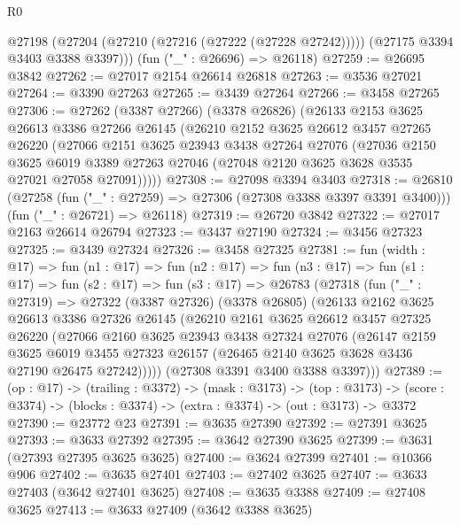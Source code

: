 \begin{lexlean}{R0}
\begin{coremodule}
      @27198 (@27204 (@27210 (@27216 (@27222 (@27228 @27242))))) (@27175 @3394 @3403 @3388 @3397)))
    (fun ("_" : @26696) => @26118)
@27259 := @26695 @3842
@27262 := @27017 @2154 @26614 @26818
@27263 := @3536 @27021
@27264 := @3390 @27263
@27265 := @3439 @27264
@27266 := @3458 @27265
@27306 := @27262
    (@3387 @27266)
    (@3378 @26826)
    (@26133
      @2153
      @3625
      @26613
      @3386
      @27266
      @26145
      (@26210
        @2152
        @3625
        @26612
        @3457
        @27265
        @26220
        (@27066
          @2151
          @3625
          @23943
          @3438
          @27264
          @27076
          (@27036
            @2150
            @3625
            @6019
            @3389
            @27263
            @27046
            (@27048 @2120 @3625 @3628 @3535 @27021 @27058 @27091)))))
@27308 := @27098 @3394 @3403
@27318 := @26810
    (@27258 (fun ("_" : @27259) => @27306 (@27308 @3388 @3397 @3391 @3400)))
    (fun ("_" : @26721) => @26118)
@27319 := @26720 @3842
@27322 := @27017 @2163 @26614 @26794
@27323 := @3437 @27190
@27324 := @3456 @27323
@27325 := @3439 @27324
@27326 := @3458 @27325
@27381 := fun (width : @17) =>
  fun (n1 : @17) =>
  fun (n2 : @17) =>
  fun (n3 : @17) =>
  fun (s1 : @17) =>
  fun (s2 : @17) =>
  fun (s3 : @17) =>
  @26783
    (@27318
      (fun ("_" : @27319) =>
      @27322
        (@3387 @27326)
        (@3378 @26805)
        (@26133
          @2162
          @3625
          @26613
          @3386
          @27326
          @26145
          (@26210
            @2161
            @3625
            @26612
            @3457
            @27325
            @26220
            (@27066
              @2160
              @3625
              @23943
              @3438
              @27324
              @27076
              (@26147
                @2159
                @3625
                @6019
                @3455
                @27323
                @26157
                (@26465 @2140 @3625 @3628 @3436 @27190 @26475 @27242)))))
        (@27308 @3391 @3400 @3388 @3397)))
@27389 := (op : @17) ->
  (trailing : @3372) ->
  (mask : @3173) ->
  (top : @3173) -> (score : @3374) -> (blocks : @3374) -> (extra : @3374) -> (out : @3173) -> @3372
@27390 := @23772 @23
@27391 := @3635 @27390
@27392 := @27391 @3625
@27393 := @3633 @27392
@27395 := @3642 @27390 @3625
@27399 := @3631 (@27393 @27395 @3625 @3625)
@27400 := @3624 @27399
@27401 := @10366 @906
@27402 := @3635 @27401
@27403 := @27402 @3625
@27407 := @3633 @27403 (@3642 @27401 @3625)
@27408 := @3635 @3388
@27409 := @27408 @3625
@27413 := @3633 @27409 (@3642 @3388 @3625)

\end{coremodule}
\end{lexlean}
